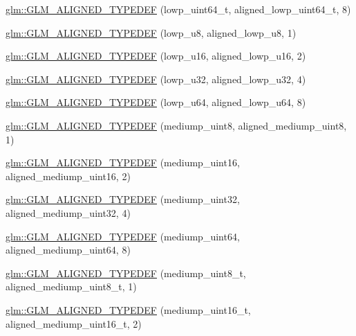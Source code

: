 \begin{DoxyCompactItemize}
\item 
\hyperlink{group__gtx__type__aligned_gaace64bddf51a9def01498da9a94fb01c}{glm\+::\+G\+L\+M\+\_\+\+A\+L\+I\+G\+N\+E\+D\+\_\+\+T\+Y\+P\+E\+D\+E\+F} (lowp\+\_\+uint64\+\_\+t, aligned\+\_\+lowp\+\_\+uint64\+\_\+t, 8)
\item 
\hyperlink{group__gtx__type__aligned_gad7bb97c29d664bd86ffb1bed4abc5534}{glm\+::\+G\+L\+M\+\_\+\+A\+L\+I\+G\+N\+E\+D\+\_\+\+T\+Y\+P\+E\+D\+E\+F} (lowp\+\_\+u8, aligned\+\_\+lowp\+\_\+u8, 1)
\item 
\hyperlink{group__gtx__type__aligned_ga404bba7785130e0b1384d695a9450b28}{glm\+::\+G\+L\+M\+\_\+\+A\+L\+I\+G\+N\+E\+D\+\_\+\+T\+Y\+P\+E\+D\+E\+F} (lowp\+\_\+u16, aligned\+\_\+lowp\+\_\+u16, 2)
\item 
\hyperlink{group__gtx__type__aligned_ga31ba41fd896257536958ec6080203d2a}{glm\+::\+G\+L\+M\+\_\+\+A\+L\+I\+G\+N\+E\+D\+\_\+\+T\+Y\+P\+E\+D\+E\+F} (lowp\+\_\+u32, aligned\+\_\+lowp\+\_\+u32, 4)
\item 
\hyperlink{group__gtx__type__aligned_gacca5f13627f57b3505676e40a6e43e5e}{glm\+::\+G\+L\+M\+\_\+\+A\+L\+I\+G\+N\+E\+D\+\_\+\+T\+Y\+P\+E\+D\+E\+F} (lowp\+\_\+u64, aligned\+\_\+lowp\+\_\+u64, 8)
\item 
\hyperlink{group__gtx__type__aligned_ga5faf1d3e70bf33174dd7f3d01d5b883b}{glm\+::\+G\+L\+M\+\_\+\+A\+L\+I\+G\+N\+E\+D\+\_\+\+T\+Y\+P\+E\+D\+E\+F} (mediump\+\_\+uint8, aligned\+\_\+mediump\+\_\+uint8, 1)
\item 
\hyperlink{group__gtx__type__aligned_ga727e2bf2c433bb3b0182605860a48363}{glm\+::\+G\+L\+M\+\_\+\+A\+L\+I\+G\+N\+E\+D\+\_\+\+T\+Y\+P\+E\+D\+E\+F} (mediump\+\_\+uint16, aligned\+\_\+mediump\+\_\+uint16, 2)
\item 
\hyperlink{group__gtx__type__aligned_ga12566ca66d5962dadb4a5eb4c74e891e}{glm\+::\+G\+L\+M\+\_\+\+A\+L\+I\+G\+N\+E\+D\+\_\+\+T\+Y\+P\+E\+D\+E\+F} (mediump\+\_\+uint32, aligned\+\_\+mediump\+\_\+uint32, 4)
\item 
\hyperlink{group__gtx__type__aligned_ga7b66a97a8acaa35c5a377b947318c6bc}{glm\+::\+G\+L\+M\+\_\+\+A\+L\+I\+G\+N\+E\+D\+\_\+\+T\+Y\+P\+E\+D\+E\+F} (mediump\+\_\+uint64, aligned\+\_\+mediump\+\_\+uint64, 8)
\item 
\hyperlink{group__gtx__type__aligned_gaa9cde002439b74fa66120a16a9f55fcc}{glm\+::\+G\+L\+M\+\_\+\+A\+L\+I\+G\+N\+E\+D\+\_\+\+T\+Y\+P\+E\+D\+E\+F} (mediump\+\_\+uint8\+\_\+t, aligned\+\_\+mediump\+\_\+uint8\+\_\+t, 1)
\item 
\hyperlink{group__gtx__type__aligned_ga1ca98c67f7d1e975f7c5202f1da1df1f}{glm\+::\+G\+L\+M\+\_\+\+A\+L\+I\+G\+N\+E\+D\+\_\+\+T\+Y\+P\+E\+D\+E\+F} (mediump\+\_\+uint16\+\_\+t, aligned\+\_\+mediump\+\_\+uint16\+\_\+t, 2)

\end{DoxyCompactItemize}

